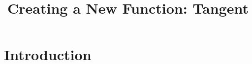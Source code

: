 \documentclass{ximera}
\author{}
\title{Creating a New Function: Tangent}
\begin{document}
\begin{abstract}
  
\end{abstract}
\maketitle



\begin{motivatingQuestions}
\item 
\item 
\item 
\end{motivatingQuestions}



\section{Introduction}






\begin{summary}
\item 
\item 
\item
\end{summary}
\end{document}
